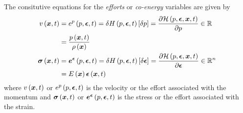 The consitutive equations for the \emph{efforts} or \emph{co-energy} variables are given by
\begin{align}
  \fnof{v}{\vectr{x},t}&=\fnof{e^{p}}{p,\vectr{\epsilon},t}=\variation{\hamiltonian{p,\vectr{\epsilon},t}}{p}=\delby{\hamiltoniandensity{p,\vectr{\epsilon},\vectr{x},t}}{p}\in\rntopology{}\\
  &=\dfrac{\fnof{p}{\vectr{x},t}}{\fnof{\rho}{\vectr{x}}}\\
  \fnof{\tensor{\sigma}}{\vectr{x},t}&=\fnof{\vectr{e}^{\vectr{\epsilon}}}{p,\vectr{\epsilon},t}=\variation{\hamiltonian{p,\vectr{\epsilon},t}}{\vectr{\epsilon}}=\delby{\hamiltoniandensity{p,\vectr{\epsilon},\vectr{x},t}}{\vectr{\epsilon}}\in\rntopology{n}\\
  &=\fnof{E}{\vectr{x}}\fnof{\vectr{\epsilon}}{\vectr{x},t}
\end{align}
where $ v\left(  \boldsymbol{x} ,t \right) $ or $ e^{p}\left( p, \boldsymbol{\epsilon} ,t \right) $ is the velocity or the effort associated with the momentum and $ \boldsymbol{\mathit{\sigma}}\left(  \boldsymbol{x} ,t \right) $ or $  \boldsymbol{e} ^{ \boldsymbol{\epsilon} }\left( p, \boldsymbol{\epsilon} ,t \right) $ is the stress or the effort associated with the strain.

